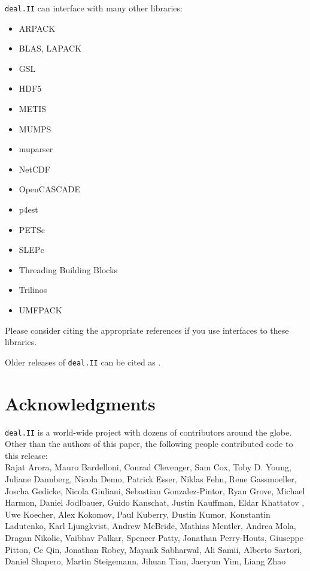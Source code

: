 \documentclass{ansarticle-preprint}
\newcommand{\specialword}[1]{\texttt{#1}}
\newcommand{\dealii}{{\specialword{deal.II}}}
\begin{document}
\dealii{} can interface with many other libraries:
\begin{multicols}{2}
\begin{itemize}
\item ARPACK \cite{arpack}
\item BLAS, LAPACK
\item GSL \cite{gsl2016}
\item HDF5 \cite{hdf5}
\item METIS \cite{karypis1998fast}
\item MUMPS \cite{ADE00,MUMPS:1,MUMPS:2,mumps-web-page}
\item muparser \cite{muparser-web-page}
\item NetCDF \cite{rew1990netcdf}
\item OpenCASCADE \cite{opencascade-web-page}
\item p4est \cite{p4est}
\item PETSc \cite{petsc-user-ref,petsc-web-page}
\item SLEPc \cite{Hernandez:2005:SSF}
\item Threading Building Blocks \cite{Rei07}
\item Trilinos \cite{trilinos,trilinos-web-page}
\item UMFPACK \cite{umfpack}
\end{itemize}
\end{multicols}
Please consider citing the appropriate references if you use interfaces to these
libraries.

Older releases of \dealii{} can be cited as \cite{dealII80,dealII81,dealII82,dealII83,dealII84,dealII85}.

\nocite{BangerthKanschat1999}

\section{Acknowledgments}

\dealii{} is a world-wide project with dozens of contributors around the
globe. Other than the authors of this paper, the following people contributed code to
this release:\\
%
%
  Rajat Arora,
  Mauro Bardelloni,
  Conrad Clevenger,
  Sam Cox,
  Toby D. Young,
  Juliane Dannberg,
  Nicola Demo,
  Patrick Esser,
  Niklas Fehn,
  Rene Gassmoeller,
  Joscha Gedicke,
  Nicola Giuliani,
  Sebastian Gonzalez-Pintor,
  Ryan Grove,
  Michael Harmon,
  Daniel Jodlbauer,
  Guido Kanschat,
  Justin Kauffman,
  Eldar Khattatov ,
  Uwe Koecher,
  Alex Kokomov,
  Paul Kuberry,
  Dustin Kumor,
  Konstantin Ladutenko,
  Karl Ljungkvist,
  Andrew McBride,
  Mathias Mentler,
  Andrea Mola,
  Dragan Nikolic,
  Vaibhav Palkar,
  Spencer Patty,
  Jonathan Perry-Houts,
  Giuseppe Pitton,
  Ce Qin,
  Jonathan Robey,
  Mayank Sabharwal,
  Ali Samii,
  Alberto Sartori,
  Daniel Shapero,
  Martin Steigemann,
  Jihuan Tian,
  Jaeryun Yim,
  Liang Zhao
\end{document}
